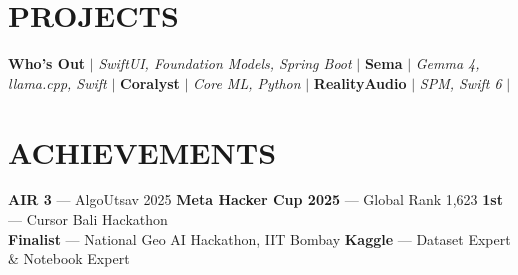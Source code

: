 \section{PROJECTS}
    \resumeSubHeadingListStart
        \resumeProjectHeading
          {\textbf{Who's Out} $|$ \emph{SwiftUI, Foundation Models, Spring Boot} $|$ \href{https://github.com/bhanage-viraj/Whos-Out}{} \hspace{2pt} \href{https://testflight.apple.com/join/avevSG7f}{}}{}
          \resumeItemListStart
          \resumeItemListEnd
        \resumeProjectHeading
          {\textbf{Sema} $|$ \emph{Gemma 4, llama.cpp, Swift} $|$ \href{https://www.kaggle.com/competitions/gemma-4-good-hackathon/writeups/new-writeup-1779016365972}{}}{}
          \resumeItemListStart
          \resumeItemListEnd
        \resumeProjectHeading
          {\textbf{Coralyst} $|$ \emph{Core ML, Python} $|$ \href{https://github.com/Gleenryan/CH5_Biorocks}{}}{}
          \resumeItemListStart
          \resumeItemListEnd
        \resumeProjectHeading
          {\textbf{RealityAudio} $|$ \emph{SPM, Swift 6} $|$ \href{https://github.com/bhanage-viraj/RealityAudio}{}}{}
          \resumeItemListStart
          \resumeItemListEnd
    \resumeSubHeadingListEnd

\section{ACHIEVEMENTS}
 \begin{itemize}[leftmargin=0in, label={}, itemsep=0pt, topsep=1pt]
    \small{\item{
     \textbf{AIR 3} --- AlgoUtsav 2025 \hspace{8pt} \textbf{Meta Hacker Cup 2025} --- Global Rank 1,623 \hspace{8pt} \textbf{1st} --- Cursor Bali Hackathon \\
     \textbf{Finalist} --- National Geo AI Hackathon, IIT Bombay \hspace{8pt} \textbf{Kaggle} --- Dataset Expert \& Notebook Expert
    }}
 \end{itemize}

